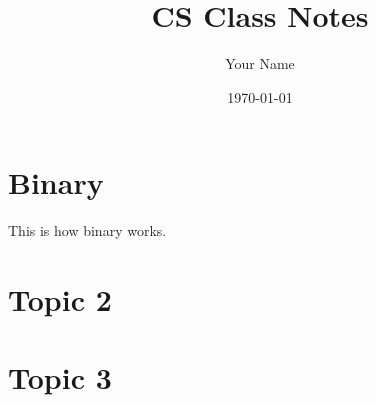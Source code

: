 \documentclass{article}
\title{CS Class Notes}
\author{Your Name}
\date{\today}
\begin{document}
\maketitle

\section{Binary}

This is how binary works.

\section{Topic 2}


\section{Topic 3}

\end{document}
